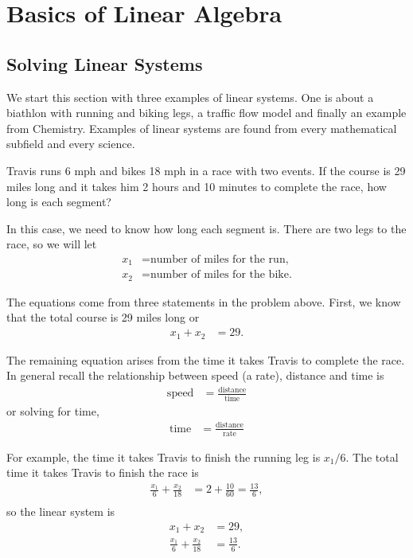 

\chapter{Basics of Linear Algebra}

\section{Solving Linear Systems} \label{sect:linear:syst}

We start this section with three examples of linear systems.  One is about a bi\-ath\-lon with running and biking legs, a traffic flow model and finally an example from Chemistry.  Examples of linear systems are found from every mathematical subfield and every science.  

\begin{example} \label{ex:biathlon}
Travis runs 6 mph and bikes 18 mph in a race with two events.  If the course is 29 miles long and it takes him 2 hours and 10 minutes to complete the race,  how long is each segment?

\solution

In this case, we need to know how long each segment is.  There are two legs to the race, so we will let
\begin{align*}
x_1 & = \text{number of miles for the run,}\\
x_2 & = \text{number of miles for the bike.}
\end{align*}


The equations come from three statements in the problem above.  First, we know that the total course is 29 miles long or
%
\begin{align*}
	x_1+x_2&=29.
\end{align*}

The remaining equation arises from the time it takes Travis to complete the race.  In general recall the relationship between speed (a rate), distance and time is
\begin{align*}
	\text{speed} & = \frac{\text{distance}}{\text{time}}
\end{align*}
or solving for time, 
\begin{align*}
	\text{time} & =\frac{\text{distance}}{\text{rate}}
\end{align*}

For example, the time it takes Travis to finish the running leg is $x_1/6$.  The total time it takes Travis to finish the race is 
%
\begin{align*}
\frac{x_1}{6} + \frac{x_2}{18}  & = 2+ \frac{10}{60} = \frac{13}{6}, \\
\end{align*}
%
so the linear system is
%
\begin{align*}
x_1+x_2&=29, \\
\frac{x_1}{6} + \frac{x_2}{18} & =\frac{13}{6}.\\
\end{align*}

\end{example}

